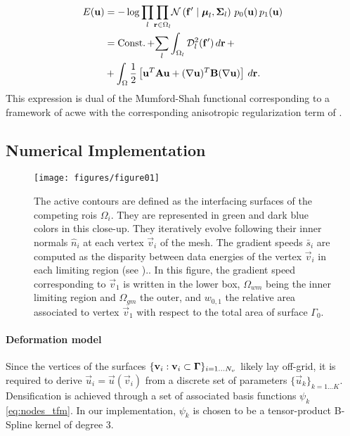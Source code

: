   \begin{align}
  E(\vec{u}) &= -\log \underset{l}{\prod}
  \underset{\vec{r} \in \Omega_l}{\prod}
  \mathcal{N} \left( \vec{f}' \mid \boldsymbol{\mu}_l, \boldsymbol{\Sigma}_l \right)\,p_0( \vec{u})\,p_1( \vec{u}) \notag\\
  &= \const + \underset{l}{\sum} \int_{\Omega_l}
  \mdist{f'}{l} \,d\vec{r} \, + \notag\\
  &+ \int_{\Omega} \frac12 \left[ \vec{u}^T \mathbf{A} \vec{u} + (\nabla \vec{u})^T \mathbf{B} (\nabla \vec{u}) \right] \,d\vec{r}.
  \label{eq:energy}
  \end{align}
%
This expression is dual of the Mumford-Shah functional corresponding
  to a framework of \acrlong*{acwe} \citep{chan_active_2001}
  with the corresponding anisotropic regularization term of \cite{nagel_investigation_1986}.


\subsection{Numerical Implementation}
\label{sec:numerical_implementation}

\begin{figure}
	\texttt{[image: figures/figure01]}
	\caption{The active contours are defined as the interfacing surfaces of the competing
	  \glspl{roi} $\Omega_i$.
	They are represented in green and dark blue colors in this close-up.
	They iteratively evolve following their inner normals $\hat{n}_i$ at each vertex
	  $\vec{v}_i$ of the mesh.
	The gradient speeds $\bar{s}_i$ are computed as the disparity between data energies of
	  the vertex $\vec{v}_i$ in each limiting region (see )..
	In this figure, the gradient speed corresponding to $\vec{v}_1$ is written in the lower
	  box, $\Omega_{wm}$ being the inner limiting region and $\Omega_{gm}$ the outer, and
    $w_{0,1}$ the relative area associated to vertex $\vec{v}_1$ with respect to
    the total area of surface $\Gamma_0$.
	}\label{fig:method}
\end{figure}

\paragraph*{Deformation model}\label{sec:deformation_model}
Since the vertices of the surfaces $\{\mathbf{v}_i: \mathbf{v}_i \subset \boldsymbol{\Gamma} \}_{i=1 \ldots N_v}$
  likely lay off-grid, it is required to derive $\vec{u}_i = \vec{u}(\vec{v}_i)$ from a discrete set of parameters
  $\{\vec{u}_k\}_{k=1 \ldots K}$.
Densification is achieved through a set of associated basis functions $\psi_k$ \eqref{eq:nodes_tfm}.
In our implementation, $\psi_k$ is chosen to be a tensor-product B-Spline kernel
  of degree 3.

